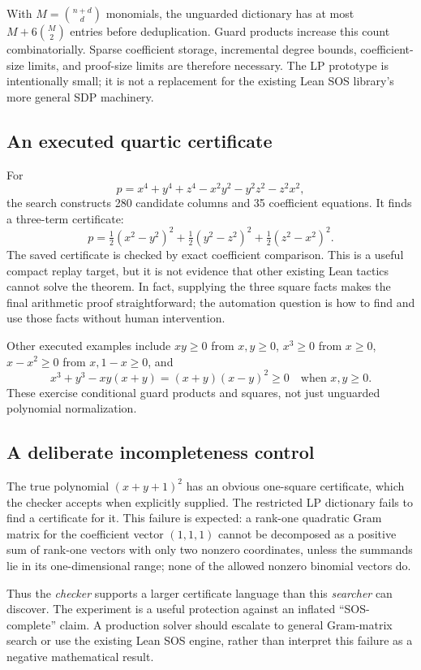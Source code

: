 \documentclass[11pt,a4paper]{article}
\begin{document}
With $M=\binom{n+d}{d}$ monomials, the unguarded dictionary has at most
$M+6\binom M2$ entries before deduplication. Guard products increase this count
combinatorially. Sparse coefficient storage, incremental degree bounds,
coefficient-size limits, and proof-size limits are therefore necessary. The
LP prototype is intentionally small; it is not a replacement for the existing
Lean SOS library's more general SDP machinery.

\subsection{An executed quartic certificate}
For
\[
 p=x^4+y^4+z^4-x^2y^2-y^2z^2-z^2x^2,
\]
the search constructs 280 candidate columns and 35 coefficient equations.
It finds a three-term certificate:
\begin{equation}\label{eq:quartic}
 p=\tfrac12(x^2-y^2)^2+\tfrac12(y^2-z^2)^2+\tfrac12(z^2-x^2)^2.
\end{equation}
The saved certificate is checked by exact coefficient comparison. This is a
useful compact replay target, but it is not evidence that other existing Lean
tactics cannot solve the theorem. In fact, supplying the three square facts
makes the final arithmetic proof straightforward; the automation question is
how to find and use those facts without human intervention.

Other executed examples include $xy\ge0$ from $x,y\ge0$, $x^3\ge0$ from
$x\ge0$, $x-x^2\ge0$ from $x,1-x\ge0$, and
\[
 x^3+y^3-xy(x+y)=(x+y)(x-y)^2\ge0
 \quad\text{when }x,y\ge0.
\]
These exercise conditional guard products and squares, not just unguarded
polynomial normalization.

\subsection{A deliberate incompleteness control}
The true polynomial $(x+y+1)^2$ has an obvious one-square certificate, which the
checker accepts when explicitly supplied. The restricted LP dictionary fails
to find a certificate for it. This failure is expected: a rank-one quadratic
Gram matrix for the coefficient vector $(1,1,1)$ cannot be decomposed as a
positive sum of rank-one vectors with only two nonzero coordinates, unless the
summands lie in its one-dimensional range; none of the allowed nonzero
binomial vectors do.

Thus the \emph{checker} supports a larger certificate language than this
\emph{searcher} can discover. The experiment is a useful protection against an
inflated ``SOS-complete'' claim. A production solver should escalate to general
Gram-matrix search or use the existing Lean SOS engine, rather than interpret
this failure as a negative mathematical result.
\end{document}
